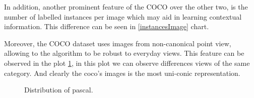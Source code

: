 \documentclass[12pt, a4paper, titlepage,twoside,openright]{article}
\begin{document}
In addition, another prominent feature of the COCO over the other two, is the number of labelled instances per image which may aid in learning contextual information. This difference can be seen in \ref{instancesImage} chart.


Moreover, the COCO dataset uses images from non-canonical point view, allowing to the algorithm to be robust to everyday views. This feature can be observed in the plot \ref{iconic}, in this plot we can observe differences views of the same category. And clearly the coco's images is the most uni-conic representation.

\begin{figure}[H]
		
\centering
{}
\caption{Distribution of pascal.} \label{iconic}

\end{figure}
\end{document}
